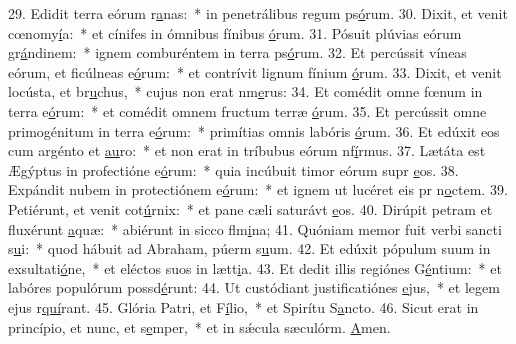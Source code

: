 29. Edidit terra eórum r\uline{a}nas:~* in penetrálibus regum ps\uline{ó}rum.
30. Dixit, et venit cœnomy\uline{í}a:~* et cínifes in ómnibus fínibus \uline{ó}rum.
31. Pósuit plúvias eórum gr\uline{á}ndinem:~* ignem comburéntem in terra ps\uline{ó}rum.
32. Et percússit víneas eórum, et ficúlneas e\uline{ó}rum:~* et contrívit lignum fínium \uline{ó}rum.
33. Dixit, et venit locústa, et br\uline{u}chus,~* cujus non erat nm\uline{e}rus:
34. Et comédit omne fœnum in terra e\uline{ó}rum:~* et comédit omnem fructum terræ \uline{ó}rum.
35. Et percússit omne primogénitum in terra e\uline{ó}rum:~* primítias omnis labóris \uline{ó}rum.
36. Et edúxit eos cum argénto et \uline{au}ro:~* et non erat in tríbubus eórum nf\uline{í}rmus.
37. Lætáta est Ægýptus in profectióne e\uline{ó}rum:~* quia incúbuit timor eórum supr \uline{e}os.
38. Expándit nubem in protectiónem e\uline{ó}rum:~* et ignem ut lucéret eis pr n\uline{o}ctem.
39. Petiérunt, et venit cot\uline{ú}rnix:~* et pane cæli saturávt \uline{e}os.
40. Dirúpit petram et fluxérunt \uline{a}quæ:~* abiérunt in sicco flm\uline{i}na;
41. Quóniam memor fuit verbi sancti s\uline{u}i:~* quod hábuit ad Abraham, púerm s\uline{u}um.
42. Et edúxit pópulum suum in exsultati\uline{ó}ne,~* et eléctos suos in lætt\uline{i}a.
43. Et dedit illis regiónes G\uline{é}ntium:~* et labóres populórum possd\uline{é}runt:
44. Ut custódiant justificatiónes \uline{e}jus,~* et legem ejus r\uline{quí}rant.
45. Glória Patri, et F\uline{í}lio,~* et Spirítu S\uline{a}ncto.
46. Sicut erat in princípio, et nunc, et s\uline{e}mper,~* et in sǽcula sæculórm. \uline{A}men.
